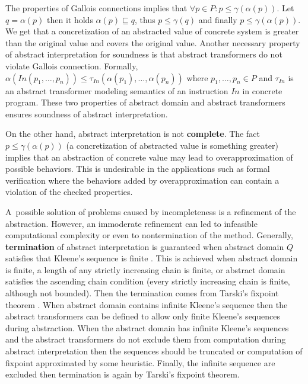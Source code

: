 \documentclass[a4paper, 12pt]{article}
\newcommand{\aord}[0]{\sqsubseteq}
\newcommand{\cord}[0]{\leq}
\newcommand{\adom}[0]{Q}
\newcommand{\aitem}[0]{q}
\newcommand{\cdom}[0]{P}
\newcommand{\citem}[0]{p}
\newcommand{\atrans}[0]{\tau}
\newcommand{\afun}[0]{\alpha}
\newcommand{\cfun}[0]{\gamma}
\begin{document}
The properties of Gallois connections implies that
$\forall \citem \in \cdom: \citem \cord \cfun(\afun(\citem))$.
Let $q = \afun(\citem)$ then it holds $\alpha(\citem) \aord \aitem$,
thus $\citem \cord \cfun(\aitem)$ and finally $\citem \cord \cfun(\afun(\citem))$.
We get that a concretization of an abstracted value of concrete system
is greater than the original value and covers the original value.
Another necessary property of abstract interpretation for soundness is
that abstract transformers do not violate Gallois connection.
Formally, $\alpha(In(\citem_1,\ldots,\citem_n)) \cord \atrans_{In}(\alpha(\citem_1),\ldots, \alpha(\citem_n))$
where $\citem_1,\ldots,\citem_n \in \cdom$ and $\atrans_{In}$ is an abstract transformer
modeling semantics of an instruction $In$ in concrete program.
These two properties of abstract domain and abstract transformers ensures
soundness of abstract interpretation.

On the other hand, abstract interpretation is not \textbf{complete}.
The fact $\citem \cord \cfun(\afun(\citem))$ (a concretization of abstracted value
is something greater) implies that an abstraction of concrete value may lead
to overapproximation of possible behaviors.
This is undesirable in the applications such as formal verification
where the behaviors added by overapproximation can contain
a violation of the checked properties.

A~possible solution of problems caused by incompleteness is a refinement of the abstraction.
However, an immoderate refinement can led to infeasible computational complexity
or even to nontermination of the method.
Generally, \textbf{termination} of abstract interpretation is guaranteed
when abstract domain $\adom$ satisfies that Kleene's sequence is finite \cite{popl77}.
This is achieved when abstract domain is finite, a length of any strictly
increasing chain is finite, or abstract domain satisfies the ascending chain
condition (every strictly increasing chain is finite, although not bounded).
Then the termination comes from Tarski's fixpoint theorem \cite{tarski}.
When abstract domain contains infinite Kleene's sequence
then the abstract transformers can be defined to allow only finite
Kleene's sequences during abstraction.
When the abstract domain has infinite Kleene's sequences and
the abstract transformers do not exclude them from computation during abstract
interpretation then the sequences should be truncated or computation
of fixpoint approximated by some heuristic.
Finally, the infinite sequence are excluded then termination is
again by Tarski's fixpoint theorem.
\end{document}
